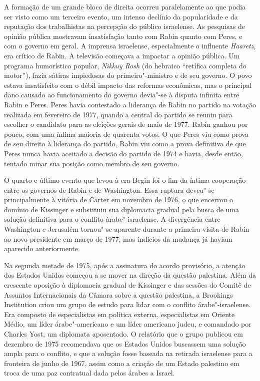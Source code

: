 A formação de um grande bloco de direita ocorreu paralelamente ao que
podia ser visto como um terceiro evento, um intenso declínio da
popularidade e da reputação dos trabalhistas na percepção do público
israelense. As pesquisas de opinião pública mostravam insatisfação tanto
com Rabin quanto com Peres, e com o governo em geral. A imprensa
israelense, especialmente o influente \emph{Haaretz}, era crítico de
Rabin. A televisão começava a impactar a opinião pública. Um programa
humorístico popular, \emph{Nikkuy Rosh} (do hebraico ``retífica completa do
motor''), fazia sátiras impiedosas do primeiro"-ministro e de seu
governo. O povo estava insatisfeito com o débil impacto das reformas
econômicas, mas o principal dano causado ao funcionamento do governo
devia"-se à disputa infinita entre Rabin e Peres. Peres havia contestado
a liderança de Rabin no partido na votação realizada em fevereiro de
1977, quando a central do partido se reuniu para escolher o candidato
para as eleições gerais de maio de 1977. Rabin ganhou por pouco, com uma
ínfima maioria de quarenta votos. O que Peres viu como prova de seu
direito à liderança do partido, Rabin viu como a prova definitiva de que
Peres nunca havia aceitado a decisão do partido de 1974 e havia, desde
então, tentado minar sua posição como membro de seu governo.

O quarto e último evento que levou à era Begin foi o fim da íntima
cooperação entre os governos de Rabin e de Washington. Essa ruptura
deveu"-se principalmente à vitória de Carter em novembro de 1976, o que
encerrou o domínio de Kissinger e substituiu sua diplomacia gradual pela
busca de uma solução definitiva para o conflito árabe"-israelense. A
divergência entre Washington e Jerusalém tornou"-se aparente durante a
primeira visita de Rabin ao novo presidente em março de 1977, mas
indícios da mudança já haviam aparecido anteriormente.

Na segunda metade de 1975, após a assinatura do acordo provisório, a
atenção dos Estados Unidos começou a se mover na direção da questão
palestina. Além da crescente oposição à diplomacia gradual de Kissinger
e das sessões do Comitê de Assuntos Internacionais da Câmara sobre a
questão palestina, a Brookings Institution criou um grupo de estudo para
lidar com o conflito árabe"-israelense. Era composto de especialistas em
política externa, especialistas em Oriente Médio, um líder
árabe"-americano e um líder americano judeu, e comandado por Charles
Yost, um diplomata aposentado. O relatório que o grupo publicou em
dezembro de 1975 recomendava que os Estados Unidos buscassem uma solução
ampla para o conflito, e que a solução fosse baseada na retirada
israelense para a fronteira de junho de 1967, assim como a criação de um
Estado palestino em troca de uma paz contratual dada pelos árabes a
Israel.

